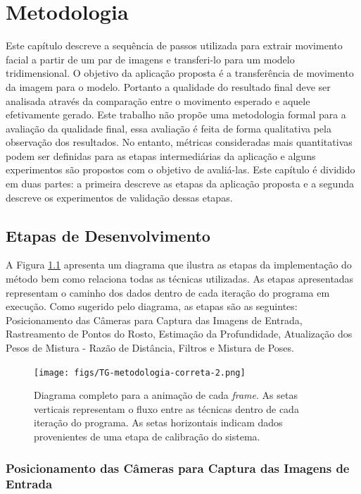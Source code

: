 \chapter{Metodologia}

Este capítulo descreve a sequência de passos utilizada para extrair movimento facial a partir de um par de imagens e transferi-lo para um modelo tridimensional. O objetivo da aplicação proposta é a transferência de movimento da imagem para o modelo. Portanto a qualidade do resultado final deve ser analisada através da comparação entre o movimento esperado e aquele efetivamente gerado. Este trabalho não propõe uma metodologia formal para a avaliação da qualidade final, essa avaliação é feita de forma qualitativa pela observação dos resultados. No entanto, métricas consideradas mais quantitativas podem ser definidas para as etapas intermediárias da aplicação e alguns experimentos são propostos com o objetivo de avaliá-las. Este capítulo é dividido em duas partes: a primeira descreve as etapas da aplicação proposta e a segunda descreve os experimentos de validação dessas etapas.

\section{Etapas de Desenvolvimento}

A Figura \ref{fig:metodologia} apresenta um diagrama que ilustra as etapas da implementação do método bem como relaciona todas as técnicas utilizadas. As etapas apresentadas representam  o caminho dos dados dentro de cada iteração do programa em execução.  Como sugerido pelo diagrama, as etapas são as seguintes: Posicionamento das Câmeras para Captura das Imagens de Entrada, Rastreamento de Pontos do Rosto, Estimação da Profundidade, Atualização dos Pesos de Mistura - Razão de Distância, Filtros e Mistura de Poses. 

\begin{figure}
\centering
\texttt{[image: figs/TG-metodologia-correta-2.png]}
\caption{Diagrama completo para a animação de cada \textit{frame}. As setas verticais representam o fluxo entre as técnicas dentro de cada iteração do programa. As setas horizontais indicam dados provenientes de uma etapa de calibração do sistema.}
\label{fig:metodologia}
\end{figure}



\subsection{Posicionamento das Câmeras para Captura das Imagens de Entrada}


